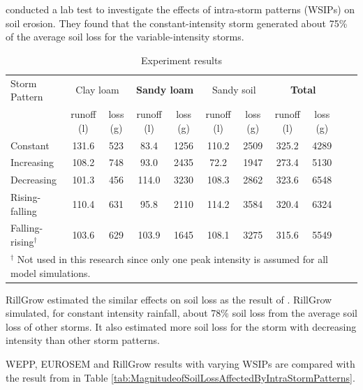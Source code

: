 \citet{parsons2006-68} conducted a lab test to investigate the effects of
intra-storm patterns (WSIPs) on soil erosion. They found that the
constant-intensity storm generated about 75\% of the average soil loss for the
variable-intensity storms.

\begin{table}[htbp]
  \caption[Experiment results]{Experiment results
\citep[From][]{parsons2006-68}}
  \label{tab:Tonysexperimentresults}
  \scriptsize
  \centering
    \begin{tabular}{lcccccccccc}
      \toprule
      Storm Pattern & \multicolumn{2}{c}{Clay loam} &
\multicolumn{2}{c}{\textbf{Sandy loam}} & \multicolumn{2}{c}{Sandy soil} &
\multicolumn{2}{c}{\textbf{Total}}\\
      \cmidrule(r){2-3} \cmidrule(rl){4-5} \cmidrule(rl){6-7}
\cmidrule(l){8-9}
      & runoff (l) & loss (g) & runoff (l) & loss (g) & runoff
(l) & loss (g) & runoff (l) & loss (g)\\
      \midrule
      Constant & 131.6 & 523 & 83.4  & 1256 & 110.2 & 2509 &
325.2 & 4289\\
      Increasing & 108.2 & 748 & 93.0  & 2435 & 72.2 & 1947 &
273.4 & 5130 \\
      Decreasing & 101.3 & 456 & 114.0 & 3230 & 108.3 & 2862 &
323.6 & 6548 \\
      Rising-falling & 110.4 & 631 & 95.8  & 2110 & 114.2 &
3584 & 320.4 & 6324\\
      Falling-rising$^\dagger$ & 103.6 & 629 & 103.9  & 1645 &
108.1 & 3275 & 315.6 & 5549\\
      \bottomrule
      \multicolumn{9}{p{11cm}}{\footnotesize $^\dagger$ Not
used in this research since only one peak intensity is assumed for all model
simulations.}\\
    \end{tabular}
\end{table}

RillGrow estimated the similar effects on soil loss as the result of
\citet{parsons2006-68}. RillGrow simulated, for constant intensity rainfall,
about 78\% soil loss from the average soil loss of other storms. It also
estimated more soil loss for the storm with decreasing intensity than other
storm patterns.

WEPP, EUROSEM and RillGrow results with varying WSIPs are
compared with the result from \citet{parsons2006-68} in Table
\ref{tab:MagnitudeofSoilLossAffectedByIntraStormPatterns}.

